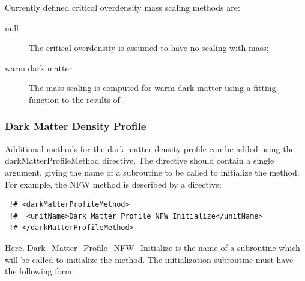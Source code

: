 Currently defined critical overdensity mass scaling methods are:
\begin{description}
 \item [{\normalfont \ttfamily null}] The critical overdensity is assumed to have no scaling with mass;
 \item [{\normalfont \ttfamily warm dark matter}] The mass scaling is computed for warm dark matter using a fitting function to the results of \cite{barkana_constraints_2001}.
\end{description}

\subsubsection{Dark Matter Density Profile}

Additional methods for the dark matter density profile can be added using the {\normalfont \ttfamily darkMatterProfileMethod} directive. The directive should contain a single argument, giving the name of a subroutine to be called to initialize the method. For example, the {\normalfont \ttfamily NFW} method is described by a directive:
\begin{verbatim}
 !# <darkMatterProfileMethod>
 !#  <unitName>Dark_Matter_Profile_NFW_Initialize</unitName>
 !# </darkMatterProfileMethod>
\end{verbatim}
Here, {\normalfont \ttfamily Dark\_Matter\_Profile\_NFW\_Initialize} is the name of a subroutine which will be called to initialize the method. The initialization subroutine must have the following form:
